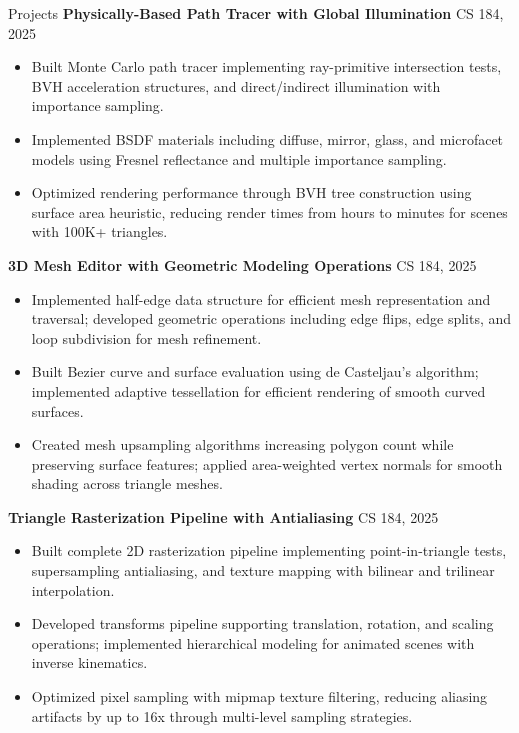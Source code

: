 \documentclass{resume}
\begin{document}
\begin{rSection}{Projects}
\textbf{Physically-Based Path Tracer with Global Illumination} \hfill CS 184, 2025
\begin{itemize}
  \item Built Monte Carlo path tracer implementing ray-primitive intersection tests, BVH acceleration structures, and direct/indirect illumination with importance sampling.
  \item Implemented BSDF materials including diffuse, mirror, glass, and microfacet models using Fresnel reflectance and multiple importance sampling.
  \item Optimized rendering performance through BVH tree construction using surface area heuristic, reducing render times from hours to minutes for scenes with 100K+ triangles.
\end{itemize}

\textbf{3D Mesh Editor with Geometric Modeling Operations} \hfill CS 184, 2025
\begin{itemize}
  \item Implemented half-edge data structure for efficient mesh representation and traversal; developed geometric operations including edge flips, edge splits, and loop subdivision for mesh refinement.
  \item Built Bezier curve and surface evaluation using de Casteljau's algorithm; implemented adaptive tessellation for efficient rendering of smooth curved surfaces.
  \item Created mesh upsampling algorithms increasing polygon count while preserving surface features; applied area-weighted vertex normals for smooth shading across triangle meshes.
\end{itemize}

\textbf{Triangle Rasterization Pipeline with Antialiasing} \hfill CS 184, 2025
\begin{itemize}
  \item Built complete 2D rasterization pipeline implementing point-in-triangle tests, supersampling antialiasing, and texture mapping with bilinear and trilinear interpolation.
  \item Developed transforms pipeline supporting translation, rotation, and scaling operations; implemented hierarchical modeling for animated scenes with inverse kinematics.
  \item Optimized pixel sampling with mipmap texture filtering, reducing aliasing artifacts by up to 16x through multi-level sampling strategies.
\end{itemize}


\end{rSection}
\end{document}
